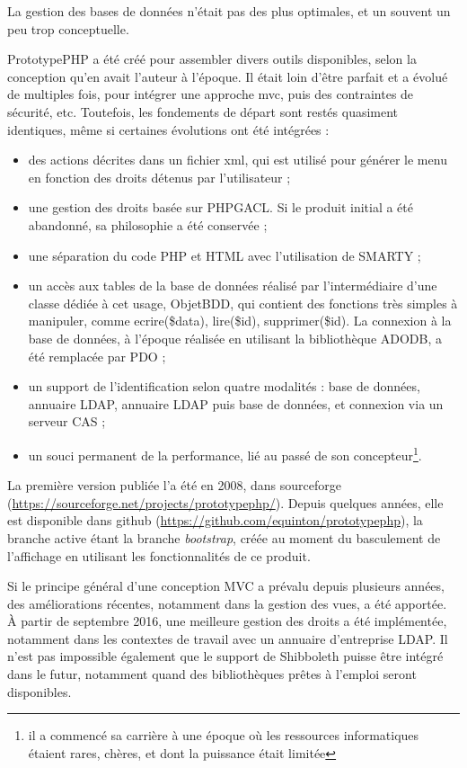 \documentclass[12pt
,a4paper
,titlepage
,twoside
]{book}
\begin{document}
La gestion des bases de données n'était pas des plus optimales, et un souvent un peu trop conceptuelle.

PrototypePHP a été créé pour assembler divers outils disponibles, selon la conception qu'en avait l'auteur à l'époque. Il était loin d'être parfait et a évolué de multiples fois, pour intégrer une approche mvc, puis des contraintes de sécurité, etc. Toutefois, les fondements de départ sont restés quasiment identiques, même si certaines évolutions ont été intégrées :
\begin{itemize}
\item des actions décrites dans un fichier xml, qui est utilisé pour générer le menu en fonction des droits détenus par l'utilisateur ;
\item une gestion des droits basée sur PHPGACL. Si le produit initial a été abandonné, sa philosophie a été conservée ;
\item une séparation du code PHP et HTML avec l'utilisation de SMARTY ;
\item un accès aux tables de la base de données réalisé par l'intermédiaire d'une classe dédiée à cet usage, ObjetBDD, qui contient des fonctions très simples à manipuler, comme ecrire(\$data), lire(\$id), supprimer(\$id). La connexion à la base de données, à l'époque réalisée en utilisant la bibliothèque ADODB, a été remplacée par PDO ;
\item un support de l'identification selon quatre modalités : base de données, annuaire LDAP, annuaire LDAP puis base de données, et connexion via un serveur CAS ;
\item un souci permanent de la performance, lié au passé de son concepteur\footnote{il a commencé sa carrière à une époque où les ressources informatiques étaient rares, chères, et dont la puissance était limitée}.
\end{itemize}

La première version publiée l'a été en 2008, dans sourceforge (\url{https://sourceforge.net/projects/prototypephp/}). Depuis quelques années, elle est disponible dans github (\url{https://github.com/equinton/prototypephp}), la branche active étant la branche \textit{bootstrap}, créée au moment du basculement de l'affichage en utilisant les fonctionnalités de ce produit.

Si le principe général d'une conception MVC a prévalu depuis plusieurs années, des améliorations récentes, notamment dans la gestion des vues, a été apportée. À partir de septembre 2016, une meilleure gestion des droits a été implémentée, notamment dans les contextes de travail avec un annuaire d'entreprise LDAP. 
Il n'est pas impossible également que le support de Shibboleth puisse être intégré dans le futur, notamment quand des bibliothèques prêtes à l'emploi seront disponibles.
\end{document}
